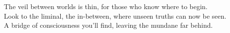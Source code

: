 \documentclass{article}
\begin{document}
\begin{infobox}
The veil between worlds is thin, for those who know where to begin.\\
Look to the liminal, the in-between, where unseen truths can now be seen.\\
A bridge of consciousness you'll find, leaving the mundane far behind.
\end{infobox}
\end{document}
